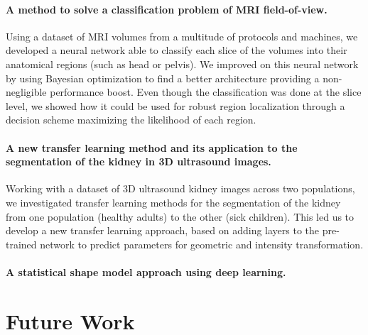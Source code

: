\paragraph*{A method to solve a classification problem of MRI field-of-view.}
Using a dataset of MRI volumes from a multitude of protocols and machines, we developed a neural network able to classify each slice of the volumes into their anatomical regions (such as head or pelvis). We improved on this neural network by using Bayesian optimization to find a better architecture providing a non-negligible performance boost. Even though the classification was done at the slice level, we showed how it could be used for robust region localization through a decision scheme maximizing the likelihood of each region.

\paragraph*{A new transfer learning method and its application to the segmentation of the kidney in 3D ultrasound images.}
Working with a dataset of 3D ultrasound kidney images across two populations, we investigated transfer learning methods for the segmentation of the kidney from one population (healthy adults) to the other (sick children). This led us to develop a new transfer learning approach, based on adding layers to the pre-trained network to predict parameters for geometric and intensity transformation. 

\paragraph*{A statistical shape model approach using deep learning.}

\section{Future Work}
